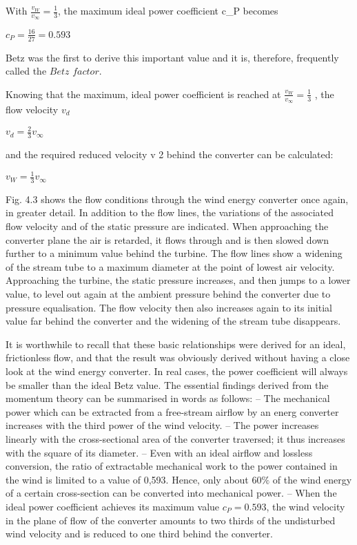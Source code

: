 With $\frac{v_W}{v_{\infty}} = \frac{1}{3}$, the maximum ideal power coefficient c_P becomes

$c_P = \frac{16}{27} = 0.593$

Betz was the first to derive this important value and it is, therefore, frequently called the $Betz$ $factor$. 

Knowing that the maximum, ideal power coefficient is reached at $\frac{v_W}{v_{\infty}} = \frac{1}{3}$ , the flow velocity $v_d$

$v_d = \frac{2}{3} v_{\infty}$
 
and the required reduced velocity v 2 behind the converter can be calculated: 
 
$v_W = \frac{1}{3} v_{\infty}$
 
Fig. 4.3 shows the flow conditions through the wind energy converter once again, in greater detail. In addition to the flow lines, the variations of the associated flow velocity and of the static pressure are indicated. When approaching the converter plane the air is retarded, it flows through and is then slowed down further to a minimum value behind the turbine. The flow lines show a widening of the stream tube to a maximum diameter at the point of lowest air velocity. Approaching the turbine, the static pressure increases, and then jumps to a lower value, to level out again at the ambient pressure behind the converter due to pressure equalisation. The flow velocity then also increases again to its initial value far behind the converter and the widening of the stream tube disappears.

It is worthwhile to recall that these basic relationships were derived for an ideal, frictionless flow, and that the result was obviously derived without having a close look at the wind energy converter. In real cases, the power coefficient will always be smaller than the ideal Betz value. The essential findings derived from the momentum theory can be summarised in words as follows:
– The mechanical power which can be extracted from a free-stream airflow by an energ converter increases with the third power of the wind velocity.
– The power increases linearly with the cross-sectional area of the converter traversed; it thus increases with the square of its diameter.
– Even with an ideal airflow and lossless conversion, the ratio of extractable mechanical work to the power contained in the wind is limited to a value of 0,593. Hence, only about $60\%$ of the wind energy of a certain cross-section can be converted into mechanical power.
– When the ideal power coefficient achieves its maximum value $c_P = 0.593$, the wind velocity in the plane of flow of the converter amounts to two thirds of the undisturbed wind velocity and is reduced to one third behind the converter.
 
